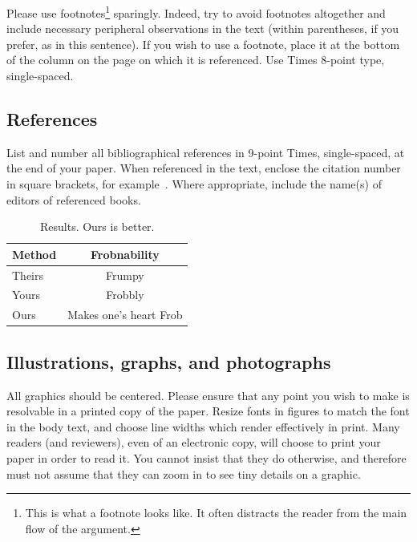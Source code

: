 \documentclass[10pt,twocolumn,letterpaper]{article}
\begin{document}
Please use footnotes\footnote {This is what a footnote looks like.  It
   often distracts the reader from the main flow of the argument.} sparingly.
Indeed, try to avoid footnotes altogether and include necessary peripheral
observations in
the text (within parentheses, if you prefer, as in this sentence).  If you
wish to use a footnote, place it at the bottom of the column on the page on
which it is referenced. Use Times 8-point type, single-spaced.


\subsection{References}

List and number all bibliographical references in 9-point Times,
single-spaced, at the end of your paper. When referenced in the text,
enclose the citation number in square brackets, for
example~\cite{Authors14}.  Where appropriate, include the name(s) of
editors of referenced books.

\begin{table}
   \begin{center}
      \begin{tabular}{|l|c|}
         \hline
         Method & Frobnability           \\
         \hline\hline
         Theirs & Frumpy                 \\
         Yours  & Frobbly                \\
         Ours   & Makes one's heart Frob \\
         \hline
      \end{tabular}
   \end{center}
   \caption{Results.   Ours is better.}
\end{table}

\subsection{Illustrations, graphs, and photographs}

All graphics should be centered.  Please ensure that any point you wish to
make is resolvable in a printed copy of the paper.  Resize fonts in figures
to match the font in the body text, and choose line widths which render
effectively in print.  Many readers (and reviewers), even of an electronic
copy, will choose to print your paper in order to read it.  You cannot
insist that they do otherwise, and therefore must not assume that they can
zoom in to see tiny details on a graphic.
\end{document}
